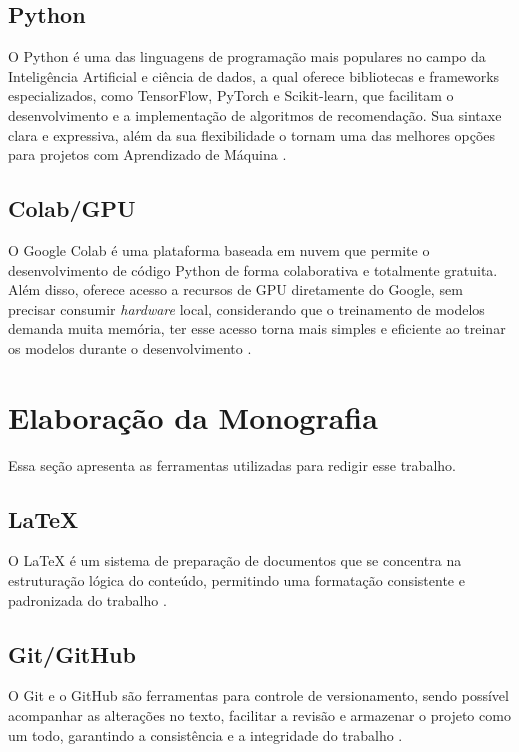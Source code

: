 \subsection{Python}\label{subsec:python}
O Python é uma das linguagens de programação mais populares no campo da Inteligência Artificial e ciência de dados, a 
qual oferece bibliotecas e frameworks especializados, como TensorFlow, PyTorch e Scikit-learn, que facilitam o 
desenvolvimento e a implementação de algoritmos de recomendação. Sua sintaxe clara e expressiva, além da sua flexibilidade 
o tornam uma das melhores opções para projetos com Aprendizado de Máquina \cite{pythonsite}.

\subsection{Colab/GPU}\label{subsec:colab}
O Google Colab é uma plataforma baseada em nuvem que permite o desenvolvimento de código Python de forma colaborativa 
e totalmente gratuita. Além disso, oferece acesso a recursos de GPU diretamente do Google, sem precisar consumir 
\textit{hardware} local, considerando que o treinamento de modelos demanda muita memória, ter esse acesso torna mais 
simples e eficiente ao treinar os modelos durante o desenvolvimento \cite{colabsite}.

\section{Elaboração da Monografia}\label{sec:elaboracaomono}
Essa seção apresenta as ferramentas utilizadas para redigir esse trabalho.

\subsection{LaTeX}\label{subsec:latex}
O LaTeX é um sistema de preparação de documentos que se concentra na estruturação lógica do conteúdo, permitindo
uma formatação consistente e padronizada do trabalho \cite{latexsite}.

\subsection{Git/GitHub}\label{subsec:git}
O Git e o GitHub são ferramentas para controle de versionamento, sendo possível acompanhar as alterações no texto,
facilitar a revisão e armazenar o projeto como um todo, garantindo a consistência e a integridade do trabalho \cite{githubsite}.

